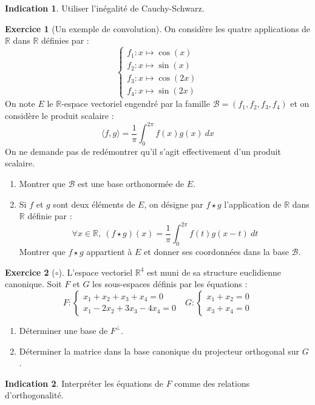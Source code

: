 \documentclass[french]{book}
\newcommand{\R}{\mathbb{R}}
\theoremstyle{definition}
\newtheorem{ex}{Exercice}[chapter]
\theoremstyle{theorem}
\newtheorem*{ind}{Indication}
\theoremstyle{remark}
\begin{document}
\begin{ind}
	Utiliser l'inégalité de Cauchy-Schwarz.
\end{ind}

\begin{ex}[Un exemple de convolution]
	On considère les quatre applications de $\R$ dans $\R$ définies par : $$\begin{cases}
		f_1:x\mapsto \cos(x)\\
		f_2:x\mapsto\sin(x)\\
		f_3:x\mapsto\cos(2x)\\
		f_4:x\mapsto\sin(2x)
	\end{cases}$$ On note $E$ le $\R$-espace vectoriel engendré par la famille $\mathcal{B}=(f_1,f_2,f_3,f_4)$ et on considère le produit scalaire : $$\langle f,g\rangle=\frac{1}{\pi}\int_{0}^{2\pi}f(x)g(x)\ dx$$ On ne demande pas de redémontrer qu'il s'agit effectivement d'un produit scalaire.
	\begin{enumerate}
		\item Montrer que $\mathcal{B}$ est une base orthonormée de $E$.
		\item Si $f$ et $g$ sont deux éléments de $E$, on désigne par $f\star g$ l'application de $\R$ dans $\R$ définie par : $$\forall x\in\R,\ (f\star g)(x)=\frac{1}{\pi}\int_{0}^{2\pi}f(t)g(x-t)\ dt$$ Montrer que $f\star g$ appartient à $E$ et donner ses coordonnées dans la base $\mathcal{B}$.
	\end{enumerate}
\end{ex}

\begin{ex}[$\circ$]
	L'espace vectoriel $\R^4$ est muni de sa structure euclidienne canonique. Soit $F$ et $G$ les sous-espaces définis par les équations : $$F:\begin{cases}
		x_1+x_2+x_3+x_4=0 \\
		x_1-2x_2+3x_3-4x_4=0
	\end{cases} \ \ \ G:\begin{cases}
	x_1+x_2=0 \\
	x_3+x_4=0
	\end{cases}$$
	\begin{enumerate}
		\item Déterminer une base de $F^\bot$.
		\item Déterminer la matrice dans la base canonique du projecteur orthogonal sur $G$.
	\end{enumerate}
\end{ex}

\begin{ind}
	Interpréter les équations de $F$ comme des relations d'orthogonalité.
\end{ind}
\end{document}
